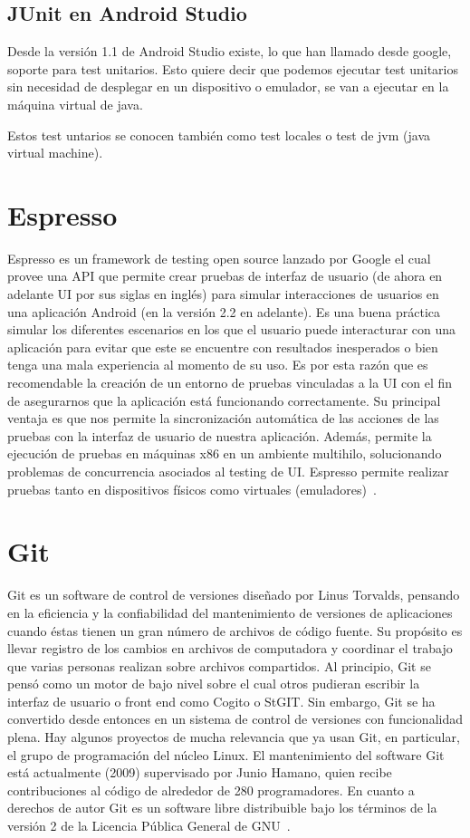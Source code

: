\subsection{JUnit en Android Studio}
Desde la versión 1.1 de Android Studio existe, lo que han llamado desde google, soporte para test unitarios. Esto quiere decir que podemos ejecutar test unitarios sin necesidad de desplegar en un dispositivo o emulador, se van a ejecutar en la máquina virtual de java. 

Estos test untarios se conocen también como test locales o test de jvm (java virtual machine). 


\section{Espresso}
Espresso es un framework de testing open source lanzado por Google el cual provee una API que permite crear pruebas de interfaz de usuario (de ahora en adelante UI por sus siglas en inglés) para simular interacciones de usuarios en una aplicación Android (en la versión 2.2 en adelante). Es una buena práctica simular los diferentes escenarios en los que el usuario puede interacturar con una aplicación para evitar que este se encuentre con resultados inesperados o bien tenga una mala experiencia al momento de su uso. Es por esta razón que es recomendable la creación de un entorno de pruebas vinculadas a la UI con el fin de asegurarnos que la aplicación está funcionando correctamente.
Su principal ventaja es que nos permite la sincronización automática de las acciones de las pruebas con la interfaz de usuario de nuestra aplicación. Además, permite la ejecución de pruebas en máquinas x86 en un ambiente multihilo, solucionando problemas de concurrencia asociados al testing de UI.
Espresso permite realizar pruebas tanto en dispositivos físicos como virtuales (emuladores)~\cite{wiki:espresso}.

\section{Git}
Git es un software de control de versiones diseñado por Linus Torvalds, pensando en la eficiencia y la confiabilidad del mantenimiento de versiones de aplicaciones cuando éstas tienen un gran número de archivos de código fuente. Su propósito es llevar registro de los cambios en archivos de computadora y coordinar el trabajo que varias personas realizan sobre archivos compartidos.
Al principio, Git se pensó como un motor de bajo nivel sobre el cual otros pudieran escribir la interfaz de usuario o front end como Cogito o StGIT.  Sin embargo, Git se ha convertido desde entonces en un sistema de control de versiones con funcionalidad plena.  Hay algunos proyectos de mucha relevancia que ya usan Git, en particular, el grupo de programación del núcleo Linux.
El mantenimiento del software Git está actualmente (2009) supervisado por Junio Hamano, quien recibe contribuciones al código de alrededor de 280 programadores. En cuanto a derechos de autor Git es un software libre distribuible bajo los términos de la versión 2 de la Licencia Pública General de GNU~\cite{wiki:git}.
